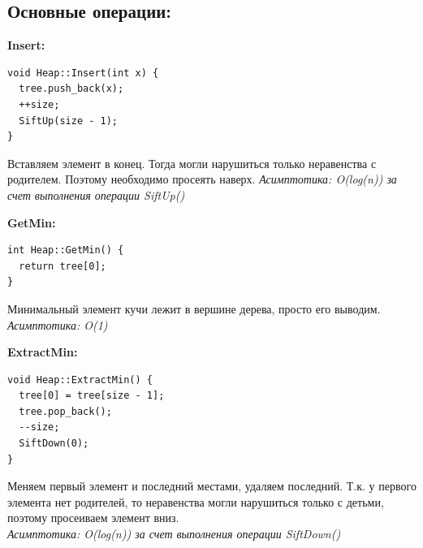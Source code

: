 \subsection*{Основные операции:}

\textbf{Insert: }
 \begin{lstlisting}
void Heap::Insert(int x) {
  tree.push_back(x); 
  ++size; 
  SiftUp(size - 1); 
}
\end{lstlisting}
Вставляем элемент в конец. Тогда могли нарушиться только неравенства с родителем. Поэтому необходимо просеять наверх.
\textit{Асимптотика: O(log(n)) за счет выполнения операции SiftUp()}

\textbf{GetMin: }
 \begin{lstlisting}
int Heap::GetMin() { 
  return tree[0]; 
}
\end{lstlisting}
Минимальный элемент кучи лежит в вершине дерева, просто его выводим. 
\textit{Асимптотика: O(1)}

\textbf{ExtractMin: }
 \begin{lstlisting}
void Heap::ExtractMin() {
  tree[0] = tree[size - 1]; 
  tree.pop_back();
  --size;
  SiftDown(0);
}
\end{lstlisting}
Меняем первый элемент и последний местами, удаляем последний. Т.к. у первого элемента нет родителей, то неравенства могли нарушиться только с детьми, поэтому просеиваем элемент вниз.\\
\textit{ Асимптотика: O(log(n)) за счет выполнения операции SiftDown()}

\pagebreak